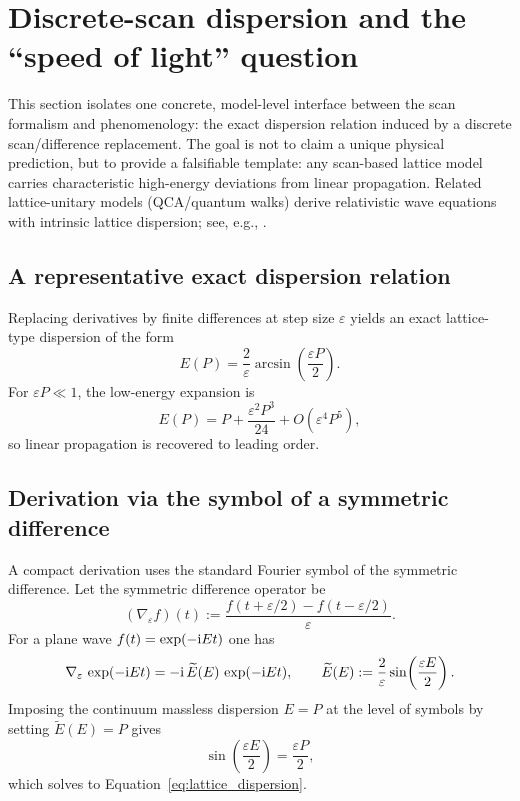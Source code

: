 \section{Discrete-scan dispersion and the ``speed of light'' question}
\label{sec:dispersion}

This section isolates one concrete, model-level interface between the scan formalism and phenomenology: the exact dispersion relation induced by a discrete scan/difference replacement.
The goal is not to claim a unique physical prediction, but to provide a falsifiable template: any scan-based lattice model carries characteristic high-energy deviations from linear propagation.
Related lattice-unitary models (QCA/quantum walks) derive relativistic wave equations with intrinsic lattice dispersion; see, e.g., \cite{BialynickiBirula1994,ArrighiNesmeForets2014}.

\subsection{A representative exact dispersion relation}
Replacing derivatives by finite differences at step size $\varepsilon$ yields an exact lattice-type dispersion of the form
\begin{equation}
E(P)=\frac{2}{\varepsilon}\arcsin\!\left(\frac{\varepsilon P}{2}\right).
\label{eq:lattice_dispersion}
\end{equation}
For $\varepsilon P\ll 1$, the low-energy expansion is
\begin{equation}
E(P)=P+\frac{\varepsilon^2 P^3}{24}+O(\varepsilon^4 P^5),
\label{eq:lattice_dispersion_low_energy}
\end{equation}
so linear propagation is recovered to leading order.

\subsection{Derivation via the symbol of a symmetric difference}
A compact derivation uses the standard Fourier symbol of the symmetric difference.
Let the symmetric difference operator be
\begin{equation}
(\nabla_{\varepsilon} f)(t):=\frac{f(t+\varepsilon/2)-f(t-\varepsilon/2)}{\varepsilon}.
\end{equation}
For a plane wave $f(t)=\exp(-\mathrm{i} E t)$ one has
\begin{equation}
\nabla_{\varepsilon}\,\exp(-\mathrm{i} E t)=-\mathrm{i}\,\widetilde{E}(E)\,\exp(-\mathrm{i} E t),
\qquad \widetilde{E}(E):=\frac{2}{\varepsilon}\sin\!\left(\frac{\varepsilon E}{2}\right).
\end{equation}
Imposing the continuum massless dispersion $E=P$ at the level of symbols by setting $\widetilde{E}(E)=P$ gives
\begin{equation}
\sin\!\left(\frac{\varepsilon E}{2}\right)=\frac{\varepsilon P}{2},
\end{equation}
which solves to Equation~\eqref{eq:lattice_dispersion}.

